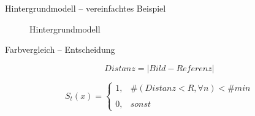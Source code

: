 \documentclass[hyperref={pdfpagelabels=false}]{beamer}
\begin{document}
\begin{frame}[t]{Hintergrundmodell -- vereinfachtes Beispiel}
\begin{figure}
\begin{minipage}{0.45\linewidth}
			\caption*{Hintergrundmodell}
		\end{minipage}
	\end{figure}
\end{frame}


\begin{frame}[t]{Farbvergleich -- Entscheidung }
	\bigskip
	\bigskip
	\bigskip

	\begin{equation*}
		Distanz = |Bild - Referenz|
	\end{equation*}

	\bigskip

	\begin{equation*}
		S_t(x)= \left\{
				\begin{array}{ll} 
					1, &  \# ( Distanz < R, \forall n) < \# min\\
					\\
					0, & sonst
				\end{array}
			\right .
	\end{equation*}
\end{frame}
\end{document}
